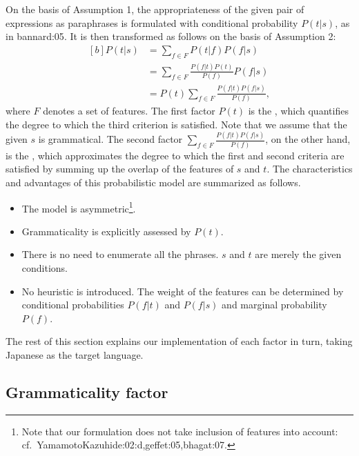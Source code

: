 \documentclass[english]{jnlp_1.4}
\renewcommand{\cite}{}
\renewcommand{\emph}[1]{}
\begin{document}
On the basis of Assumption 1, the appropriateness of the given pair of
expressions as paraphrases is formulated with conditional probability
$P(t|s)$, as in \cite{bannard:05}.
It is then transformed as follows on the basis of Assumption 2:
\begin{equation}
\begin{aligned}[b]
 P(t|s) &= \sum_{f\in F}P(t|f)P(f|s) \\
 	&= \sum_{f\in F}\frac{P(f|t)P(t)}{P(f)}P(f|s) \\
	&= P(t)\sum_{f\in F}\frac{P(f|t)P(f|s)}{P(f)},
\end{aligned}
\label{eq:overall}
\end{equation}
where $F$ denotes a set of features.
The first factor $P(t)$ is the \emph{grammaticality factor}, which
quantifies the degree to which the third criterion is satisfied.  Note
that we assume that the given $s$ is grammatical.
The second factor $\sum_{f\in F}\frac{P(f|t)P(f|s)}{P(f)}$, on the
other hand, is the \emph{similarity factor}, which approximates the
degree to which the first and second criteria are satisfied by summing
up the overlap of the features of $s$ and $t$.
The characteristics and advantages of this probabilistic model are
summarized as follows.
\begin{itemize}
\item The model is asymmetric\footnote{Note that our formulation does
  not take inclusion of features into account:
  cf.~\cite{YamamotoKazuhide:02:d,geffet:05,bhagat:07}.}.
\item Grammaticality is explicitly assessed by $P(t)$.
\item There is no need to enumerate all the phrases.  $s$ and $t$ are
  merely the given conditions.
\item No heuristic is introduced.  The weight of the features can be
  determined by conditional probabilities $P(f|t)$ and $P(f|s)$ and
  marginal probability $P(f)$.
\end{itemize}
The rest of this section explains our implementation of each factor in
turn, taking Japanese as the target language.

\subsection{Grammaticality factor}
\label{ssec:grammaticality}
\end{document}

